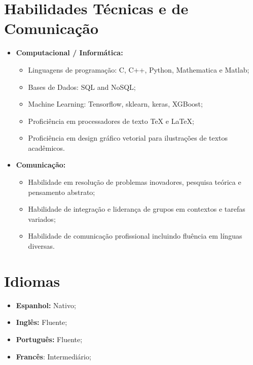 \documentclass[11pt,a4paper,sans]{moderncv}        %
\begin{document}
\section{Habilidades Técnicas e de Comunicação}

\vspace{4pt}

\begin{itemize}

\item \textbf{Computacional / Informática:} 
\begin{itemize}
\item Linguagens de programação: C, C++, Python, Mathematica e Matlab;
\item Bases de Dados: SQL and NoSQL;
\item Machine Learning: Tensorflow, sklearn, keras, XGBoost; 
\item Proficiência em processadores de texto TeX e LaTeX;
\item Proficiência em design gráfico vetorial para ilustrações de textos acadêmicos. 
\end{itemize}

\item \textbf{Comunicação:} 

\begin{itemize}
\item Habilidade em resolução de problemas inovadores, pesquisa teórica e pensamento abstrato;
\vspace{1pt}
\item Habilidade de integração e liderança de grupos em contextos e tarefas variados; 
\vspace{1pt}
\item Habilidade de comunicação profissional incluindo fluência em línguas diversas.

\end{itemize}

\end{itemize}

\section{Idiomas}
\vspace{4pt}
\begin{itemize}
\item{\textbf{Espanhol:}} Nativo;
\item{\textbf{Inglês:}} Fluente;
\item{\textbf{Português:}} Fluente;
\item{\textbf{Francês}:} Intermediário;
\end{itemize}
\end{document}
